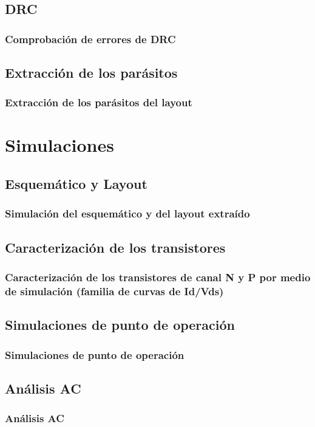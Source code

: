 \documentclass{beamer}
\begin{document}
\subsection{DRC}
\begin{frame}
\frametitle{Comprobación de errores de DRC}
\end{frame}
\subsection{Extracción de los parásitos}
\begin{frame}
\frametitle{Extracción de los parásitos del layout}
\end{frame}
\section{Simulaciones}
\subsection{Esquemático y Layout}
\begin{frame}
\frametitle{Simulación del esquemático y del layout extraído}
\end{frame}
\subsection{Caracterización de los transistores}
\begin{frame}
\frametitle{Caracterización de los transistores de canal N y P por medio de simulación (familia de curvas de Id/Vds)}
\end{frame}
\subsection{Simulaciones de punto de operación}
\begin{frame}
\frametitle{Simulaciones de punto de operación}
\end{frame}
\subsection{Análisis AC}
\begin{frame}
\frametitle{Análisis AC}
\end{frame}
\end{document}
